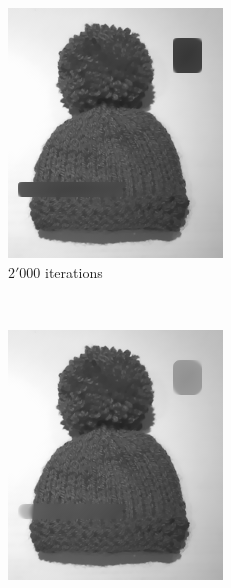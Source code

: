 \documentclass{paper}
\begin{document}
\begin{figure}[ht]
\vspace{3mm}
\begin{subfigure}[ht]{0.3\textwidth}
	\centering
	\includegraphics[width=\textwidth]{hat-iter2000-lambda100-alpha0_001}
	\caption*{$2'000$ iterations}
\end{subfigure}
~
\begin{subfigure}[ht]{0.3\textwidth}
	\centering
	\includegraphics[width=\textwidth]{hat-iter5000-lambda100-alpha0_001}

\end{subfigure}
\end{figure}
\end{document}
